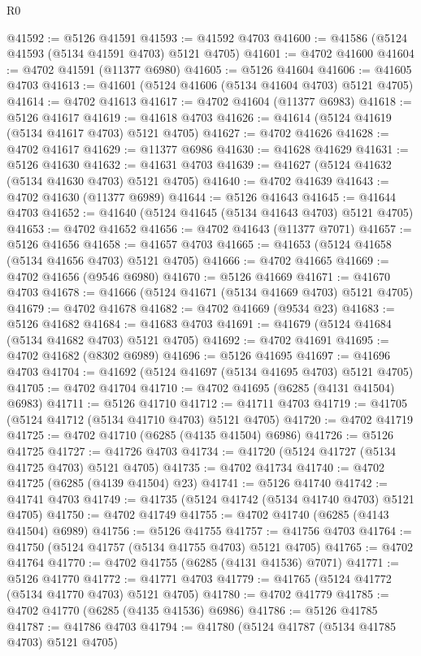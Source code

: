 \begin{lexlean}{R0}
\begin{coremodule}
@41592 := @5126 @41591
@41593 := @41592 @4703
@41600 := @41586 (@5124 @41593 (@5134 @41591 @4703) @5121 @4705)
@41601 := @4702 @41600
@41604 := @4702 @41591 (@11377 @6980)
@41605 := @5126 @41604
@41606 := @41605 @4703
@41613 := @41601 (@5124 @41606 (@5134 @41604 @4703) @5121 @4705)
@41614 := @4702 @41613
@41617 := @4702 @41604 (@11377 @6983)
@41618 := @5126 @41617
@41619 := @41618 @4703
@41626 := @41614 (@5124 @41619 (@5134 @41617 @4703) @5121 @4705)
@41627 := @4702 @41626
@41628 := @4702 @41617
@41629 := @11377 @6986
@41630 := @41628 @41629
@41631 := @5126 @41630
@41632 := @41631 @4703
@41639 := @41627 (@5124 @41632 (@5134 @41630 @4703) @5121 @4705)
@41640 := @4702 @41639
@41643 := @4702 @41630 (@11377 @6989)
@41644 := @5126 @41643
@41645 := @41644 @4703
@41652 := @41640 (@5124 @41645 (@5134 @41643 @4703) @5121 @4705)
@41653 := @4702 @41652
@41656 := @4702 @41643 (@11377 @7071)
@41657 := @5126 @41656
@41658 := @41657 @4703
@41665 := @41653 (@5124 @41658 (@5134 @41656 @4703) @5121 @4705)
@41666 := @4702 @41665
@41669 := @4702 @41656 (@9546 @6980)
@41670 := @5126 @41669
@41671 := @41670 @4703
@41678 := @41666 (@5124 @41671 (@5134 @41669 @4703) @5121 @4705)
@41679 := @4702 @41678
@41682 := @4702 @41669 (@9534 @23)
@41683 := @5126 @41682
@41684 := @41683 @4703
@41691 := @41679 (@5124 @41684 (@5134 @41682 @4703) @5121 @4705)
@41692 := @4702 @41691
@41695 := @4702 @41682 (@8302 @6989)
@41696 := @5126 @41695
@41697 := @41696 @4703
@41704 := @41692 (@5124 @41697 (@5134 @41695 @4703) @5121 @4705)
@41705 := @4702 @41704
@41710 := @4702 @41695 (@6285 (@4131 @41504) @6983)
@41711 := @5126 @41710
@41712 := @41711 @4703
@41719 := @41705 (@5124 @41712 (@5134 @41710 @4703) @5121 @4705)
@41720 := @4702 @41719
@41725 := @4702 @41710 (@6285 (@4135 @41504) @6986)
@41726 := @5126 @41725
@41727 := @41726 @4703
@41734 := @41720 (@5124 @41727 (@5134 @41725 @4703) @5121 @4705)
@41735 := @4702 @41734
@41740 := @4702 @41725 (@6285 (@4139 @41504) @23)
@41741 := @5126 @41740
@41742 := @41741 @4703
@41749 := @41735 (@5124 @41742 (@5134 @41740 @4703) @5121 @4705)
@41750 := @4702 @41749
@41755 := @4702 @41740 (@6285 (@4143 @41504) @6989)
@41756 := @5126 @41755
@41757 := @41756 @4703
@41764 := @41750 (@5124 @41757 (@5134 @41755 @4703) @5121 @4705)
@41765 := @4702 @41764
@41770 := @4702 @41755 (@6285 (@4131 @41536) @7071)
@41771 := @5126 @41770
@41772 := @41771 @4703
@41779 := @41765 (@5124 @41772 (@5134 @41770 @4703) @5121 @4705)
@41780 := @4702 @41779
@41785 := @4702 @41770 (@6285 (@4135 @41536) @6986)
@41786 := @5126 @41785
@41787 := @41786 @4703
@41794 := @41780 (@5124 @41787 (@5134 @41785 @4703) @5121 @4705)

\end{coremodule}
\end{lexlean}
